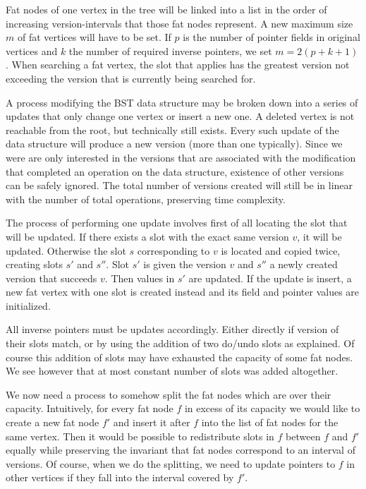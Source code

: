 Fat nodes of one vertex in the tree will be linked into a list in the order of increasing version-intervals that those fat nodes represent. A new maximum size $m$ of fat vertices will have to be set. If $p$ is the number of pointer fields in original vertices and $k$ the number of required inverse pointers, we set $m = 2(p+k+1)$.
When searching a fat vertex, the slot that applies has the greatest version not exceeding the version that is currently being searched for.

A process modifying the BST data structure may be broken down into a series of updates that only change one vertex or insert a new one. A deleted vertex is not reachable from the root, but technically still exists.
Every such update of the data structure will produce a new version (more than one typically). Since we were are only interested in the versions that are associated with the modification that completed an operation on the data structure, existence of other versions can be safely ignored. The total number of versions created will still be in linear with the number of total operations, preserving time complexity.

The process of performing one update involves first of all locating the slot that will be updated. If there exists a slot with the exact same version $v$, it will be updated. Otherwise the slot $s$ corresponding to $v$ is located and copied twice, creating slots $s'$ and $s''$. Slot $s'$ is given the version $v$ and $s''$ a newly created version that succeeds $v$. Then values in $s'$ are updated.
If the update is insert, a new fat vertex with one slot is created instead and its field and pointer values are initialized.

All inverse pointers must be updates accordingly. Either directly if version of their slots match, or by using the addition of two do/undo slots as explained. Of course this addition of slots may have exhausted the capacity of some fat nodes. We see however that at most constant number of slots was added altogether. 

We now need a process to somehow split the fat nodes which are over their capacity. Intuitively, for every fat node $f$ in excess of its capacity we would like to create a new fat node $f'$ and insert it after $f$ into the list of fat nodes for the same vertex. Then it would be possible to redistribute slots in $f$ between $f$ and $f'$ equally while preserving the invariant that fat nodes correspond to an interval of versions. Of course, when we do the splitting, we need to update pointers to $f$ in other vertices if they fall into the interval covered by $f'$.

